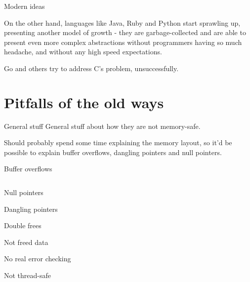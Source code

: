 \documentclass[usenames,dvipsnames,10pt,aspectratio=169]{beamer}
\begin{document}
\begin{frame}{Modern ideas}

On the other hand, languages like Java, 
Ruby and Python start sprawling up, 
presenting another model of growth - 
they are garbage-collected and are able 
to present even more complex abstractions 
without programmers having so much headache, 
and without any high speed expectations.

Go and others try to address C’s problem, unsuccessfully.

\end{frame}


\section{Pitfalls of the old ways}

\begin{frame}{General stuff} 
	General stuff about how they are not memory-safe.
	

	Should probably spend some time explaining the memory layout,
	so it'd be possible to explain buffer overflows, dangling 
	pointers and null pointers.
\end{frame}

\begin{frame}{Buffer overflows} 
	\inputminted[fontsize=\Large]{rust}{helloworld.rs}
\end{frame}

\begin{frame}{Null pointers}
\end{frame}

\begin{frame}{Dangling pointers} 
\end{frame}

\begin{frame}{Double frees} 
\end{frame}

\begin{frame}{Not freed data} 
\end{frame}

\begin{frame}{No real error checking} 
\end{frame}

\begin{frame}{Not thread-safe} 
\end{frame}
\end{document}
